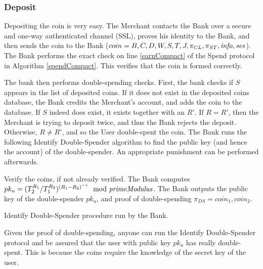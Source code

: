 \subsubsection{Deposit}
Depositing the coin is very easy. The Merchant contacts the Bank over a secure and one-way authenticated channel (\ie SSL), proves his identity to the Bank, and then sends the coin to the Bank ($coin = B,C,D,W,S,T,J,\pi_{CL},\pi_{ST},\mathit{info},\mathit{ses}$). The Bank performs the exact check on line \ref{earnCompact} of the Spend protocol in Algorithm \ref{spendCompact}. This verifies that the coin is formed correctly.

The bank then performs double-spending checks. First, the bank checks if $S$ appears in the list of deposited coins. If it does not exist in the deposited coins database, the Bank credits the Merchant's account, and adds the coin to the database. If $S$ indeed does exist, it exists together with an $R'$. If $R = R'$, then the Merchant is trying to deposit twice, and thus the Bank rejects the deposit. Otherwise, $R \neq R'$, and so the User double-spent the coin. The Bank runs the following Identify Double-Spender algorithm to find the public key (and hence the account) of the double-spender. An appropriate punishment can be performed afterwards.


\begin{algorithm}[H]\label{identifyCompact}
\dontprintsemicolon

\BlankLine

 \;
\Indp
  Verify the coins, if not already verified. \;
  The Bank computes $pk_u = (T_2^{R_1} / T_1^{R_2})^{(R_1 - R_2)^{-1}} \mod {\mathit{primeModulus}}$. \;
  The Bank outputs the public key of the double-spender $pk_u$, and proof of double-spending $\pi_{DS} = coin_1,coin_2$. \;
\Indm

\caption{Identify Double-Spender procedure run by the Bank.}
\end{algorithm}


Given the proof of double-spending, anyone can run the Identify Double-Spender protocol and be assured that the user with public key $pk_u$ has really double-spent. This is because the coins require the knowledge of the secret key of the user.
